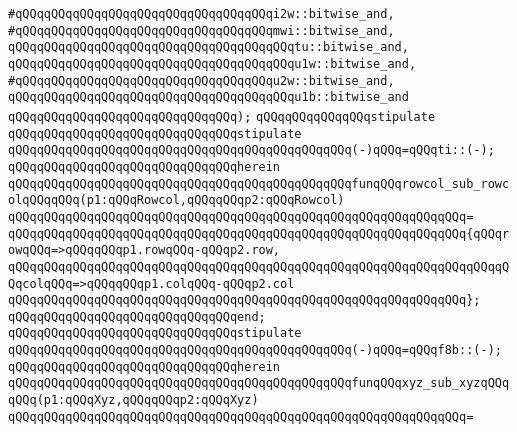 \verb|#qQQqqQQqqQQqqQQqqQQqqQQqqQQqqQQqqQQqi2w::bitwise_and,|\newline
\verb|#qQQqqQQqqQQqqQQqqQQqqQQqqQQqqQQqqQQqmwi::bitwise_and,|\newline
\verb|qQQqqQQqqQQqqQQqqQQqqQQqqQQqqQQqqQQqqQQqtu::bitwise_and,|\newline
\verb|qQQqqQQqqQQqqQQqqQQqqQQqqQQqqQQqqQQqqQQqu1w::bitwise_and,|\newline
\verb|#qQQqqQQqqQQqqQQqqQQqqQQqqQQqqQQqqQQqu2w::bitwise_and,|\newline
\verb|qQQqqQQqqQQqqQQqqQQqqQQqqQQqqQQqqQQqqQQqu1b::bitwise_and|\newline
\verb|qQQqqQQqqQQqqQQqqQQqqQQqqQQqqQQq);|\newline
\newline
\verb|qQQqqQQqqQQqqQQqstipulate|\newline
\verb|qQQqqQQqqQQqqQQqqQQqqQQqqQQqqQQqstipulate|\newline
\verb|qQQqqQQqqQQqqQQqqQQqqQQqqQQqqQQqqQQqqQQqqQQqqQQq(-)qQQq=qQQqti::(-);|\newline
\verb|qQQqqQQqqQQqqQQqqQQqqQQqqQQqqQQqherein|\newline
\verb|qQQqqQQqqQQqqQQqqQQqqQQqqQQqqQQqqQQqqQQqqQQqqQQqfunqQQqrowcol_sub_rowcolqQQqqQQq(p1:qQQqRowcol,qQQqqQQqp2:qQQqRowcol)|\newline
\verb|qQQqqQQqqQQqqQQqqQQqqQQqqQQqqQQqqQQqqQQqqQQqqQQqqQQqqQQqqQQqqQQq=|\newline
\verb|qQQqqQQqqQQqqQQqqQQqqQQqqQQqqQQqqQQqqQQqqQQqqQQqqQQqqQQqqQQqqQQq{qQQqrowqQQq=>qQQqqQQqp1.rowqQQq-qQQqp2.row,|\newline
\verb|qQQqqQQqqQQqqQQqqQQqqQQqqQQqqQQqqQQqqQQqqQQqqQQqqQQqqQQqqQQqqQQqqQQqqQQqcolqQQq=>qQQqqQQqp1.colqQQq-qQQqp2.col|\newline
\verb|qQQqqQQqqQQqqQQqqQQqqQQqqQQqqQQqqQQqqQQqqQQqqQQqqQQqqQQqqQQqqQQq};|\newline
\verb|qQQqqQQqqQQqqQQqqQQqqQQqqQQqqQQqend;|\newline
\newline
\verb|qQQqqQQqqQQqqQQqqQQqqQQqqQQqqQQqstipulate|\newline
\verb|qQQqqQQqqQQqqQQqqQQqqQQqqQQqqQQqqQQqqQQqqQQqqQQq(-)qQQq=qQQqf8b::(-);|\newline
\verb|qQQqqQQqqQQqqQQqqQQqqQQqqQQqqQQqherein|\newline
\verb|qQQqqQQqqQQqqQQqqQQqqQQqqQQqqQQqqQQqqQQqqQQqqQQqfunqQQqxyz_sub_xyzqQQqqQQq(p1:qQQqXyz,qQQqqQQqp2:qQQqXyz)|\newline
\verb|qQQqqQQqqQQqqQQqqQQqqQQqqQQqqQQqqQQqqQQqqQQqqQQqqQQqqQQqqQQqqQQq=|\newline
